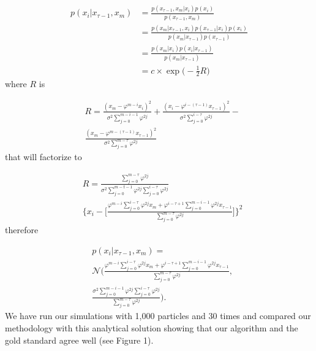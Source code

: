 \begin{align*}
    p(x_i | x_{\tau-1}, x_m) &= \frac{p(x_{\tau-1}, x_m | x_i) p(x_i)}{p(x_{\tau-1}, x_m)} \\
    &= \frac{p(x_m | x_{\tau-1}, x_i) p(x_{\tau-1} | x_i) p(x_i)}{p(x_m | x_{\tau-1}) p(x_{\tau-1})} \\
    &= \frac{p(x_m | x_i) p(x_i | x_{\tau-1})}{p(x_m | x_{\tau-1})} \\
    &= c\times \exp\Big(-\frac{1}{2} R\Big)
\end{align*}
where $R$ is

\begin{align*}
    &R = \frac{(x_m - \varphi^{m-i} x_i)^2}{\sigma^2 \sum_{j=0}^{m-i-1} \varphi^{2j}} + \frac{(x_i - \varphi^{i-(\tau-1)} x_{\tau-1})^2}{\sigma^2 \sum_{j=0}^{i-\tau} \varphi^{2j}} - \\
    &\frac{(x_m - \varphi^{m -(\tau-1)} x_{\tau-1})^2}{\sigma^2 \sum_{j=0}^{m-\tau} \varphi^{2j}}
\end{align*}
that will factorize to

\begin{align*}
    &R = \frac{\sum_{j=0}^{m-\tau} \varphi^{2j}}{\sigma^2 \sum_{j=0}^{m-t-1} \varphi^{2j} \sum_{j=0}^{i-\tau} \varphi^{2j}} \\
    &\Bigg\{ x_i - \Bigg[\frac{\varphi^{m-i} \sum_{j=0}^{i-\tau} \varphi^{2j} x_{m} + \varphi^{i-\tau+1} \sum_{j=0}^{m-i-1} \varphi^{2j} x_{\tau-1}}{\sum_{j=0}^{m-\tau} \varphi^{2j}}\Bigg] \Bigg\}^2
\end{align*}
therefore

\begin{align*}
      &p(x_i | x_{\tau-1}, x_{m}) = \\
      &\mathcal{N} \Bigg(\frac{\varphi^{m-i} \sum_{j=0}^{i-\tau} \varphi^{2j} x_{m} + \varphi^{i-\tau+1} \sum_{j=0}^{m-i-1} \varphi^{2j} x_{\tau-1}}{\sum_{j=0}^{m-\tau} \varphi^{2j}}, \\ &\frac{\sigma^2 \sum_{j=0}^{m-i-1} \varphi^{2j} \sum_{j=0}^{i-\tau} \varphi^{2j}}{\sum_{j=0}^{m-\tau} \varphi^{2j}} \Bigg).
\end{align*}
We have run our simulations with 1,000 particles and 30 times and compared our methodology with this analytical solution showing that our algorithm and the gold standard agree well (see Figure 1).


